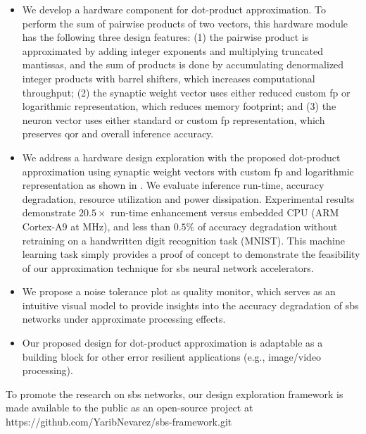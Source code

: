 \begin{itemize}
	\item We develop a hardware component for dot-product approximation. To perform the sum of pairwise products of two vectors, this hardware module has the following three design features: (1) the pairwise product is approximated by adding integer exponents and multiplying truncated mantissas, and the sum of products is done by accumulating denormalized integer products with barrel shifters, which increases computational throughput; (2) the synaptic weight vector uses either reduced custom \gls{fp} or logarithmic representation, which reduces memory footprint; and (3) the neuron vector uses either standard or custom \gls{fp} representation, which preserves \gls{qor} and overall inference accuracy.
	\item We address a hardware design exploration with the proposed dot-product approximation using synaptic weight vectors with custom \gls{fp} and logarithmic representation as shown in . We evaluate inference run-time, accuracy degradation, resource utilization and power dissipation. Experimental results demonstrate $20.5\times$ run-time enhancement versus embedded CPU (ARM Cortex-A9 at \unit[666]{MHz}), and less than $0.5\%$ of accuracy degradation without retraining on a handwritten digit recognition task (MNIST). This machine learning task simply provides a proof of concept to demonstrate the feasibility of our approximation technique for \gls{sbs} neural network accelerators.
	\item We propose a noise tolerance plot as quality monitor, which serves as an intuitive visual model to provide insights into the accuracy degradation of \gls{sbs} networks under approximate processing effects.
	\item Our proposed design for dot-product approximation is adaptable as a building block for other error resilient applications (e.g., image/video processing).
\end{itemize}

To promote the research on \gls{sbs} networks, our design exploration framework is made available to the public as an open-source project at https://github.com/YaribNevarez/sbs-framework.git

